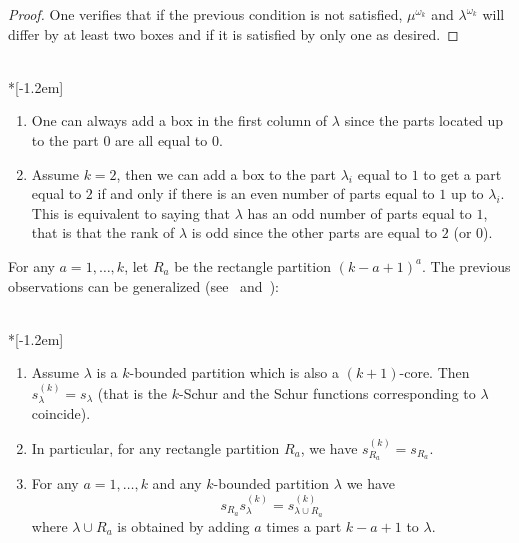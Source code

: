 \documentclass[ALCO,ThmDefs,Unicode,epreuves]{cedram}
\begin{document}
\begin{proof}
One verifies that if the previous condition is not satisfied, $\mu^{\omega
_{k}}$ and $\lambda^{\omega_{k}}$ will differ by at least two boxes and if it
is satisfied by only one as desired.
\end{proof}


\begin{exam}\ \\*[-1.2em]

\begin{enumerate}
\item One can always add a box in the first column of $\lambda$ since the
parts located up to the part $0$ are all equal to $0$.

\item Assume $k=2$, then we can add a box to the part $\lambda_{i}$ equal to
$1$ to get a part equal to $2$ if and only if there is an even number of parts
equal to $1$ up to $\lambda_{i}$. This is equivalent to saying that $\lambda$
has an odd number of parts equal to $1$, that is that the rank of $\lambda$ is
odd since the other parts are equal to $2$ (or $0$).
\end{enumerate}
\end{exam}


For any $a=1,\ldots,k$, let $R_{a}$ be the rectangle partition $(k-a+1)^{a}$.
The previous observations can be generalized (see~\cite[Corollary~8.3]{LamLR}  and~\cite[Section~4]{LLMSSZ}):

\begin{prop}\ \\*[-1.2em] 

\begin{enumerate}
\item Assume $\lambda$ is a $k$-bounded partition which is also a
$(k+1)$-core. Then $s_{\lambda}^{(k)}=s_{\lambda}$ (that is the $k$-Schur and
the Schur functions corresponding to $\lambda$ coincide).

\item In particular, for any rectangle partition $R_{a}$, we have $s_{R_{a}%
}^{(k)}=s_{R_{a}}$.

\item For any $a=1,\ldots,k$ and any $k$-bounded partition $\lambda$ we have
\[
s_{R_{a}}s_{\lambda}^{(k)}=s_{\lambda\cup R_{a}}^{(k)}%
\]
where $\lambda\cup R_{a}$ is obtained by adding $a$ times a part $k-a+1$ to
$\lambda$.
\end{enumerate}
\end{prop}
\end{document}

